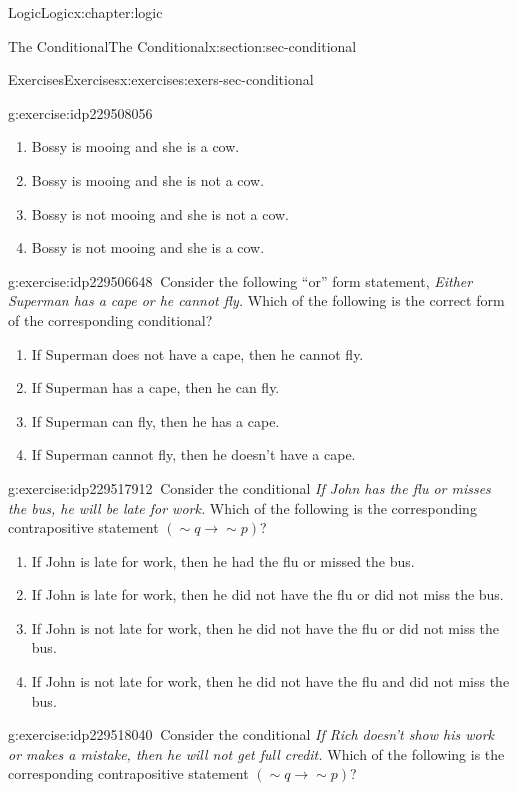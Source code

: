 \documentclass[twoside,10pt,]{book}
\numberwithin{equation}{section}
\newcommand{\contrapositive}{{\sim\!{q}{} {\rightarrow} \sim\!{p}{}}}
\begin{document}
\begin{chapterptx}{Logic}{}{Logic}{}{}{x:chapter:logic}
\begin{sectionptx}{The Conditional}{}{The Conditional}{}{}{x:section:sec-conditional}
\begin{exercises-subsection}{Exercises}{}{Exercises}{}{}{x:exercises:exers-sec-conditional}
\begin{divisionexercise}{31}{}{}{g:exercise:idp229508056}
\begin{enumerate}[label=(\alph*)]
\item{}Bossy is mooing and she is a cow.%
\item{}Bossy is mooing and she is not a cow.%
\item{}Bossy is not mooing and she is not a cow.%
\item{}Bossy is not mooing and she is a cow.%
\end{enumerate}
\end{divisionexercise}%
\begin{divisionexercise}{32}{}{}{g:exercise:idp229506648}%
\(\ \)Consider the following ``or'' form statement, \emph{Either Superman has a cape or he cannot fly.}  Which of the following is the correct form of the corresponding conditional? %
\begin{enumerate}[label=(\alph*)]
\item{}If Superman does not have a cape, then he cannot fly.%
\item{}If Superman has a cape, then he can fly.%
\item{}If Superman can fly, then he has a cape.%
\item{}If Superman cannot fly, then he doesn't have a cape.%
\end{enumerate}
\end{divisionexercise}%
\begin{divisionexercise}{33}{}{}{g:exercise:idp229517912}%
\(\ \)Consider the conditional \emph{If John has the flu or misses the bus, he will be late for work.}  Which of the following is the corresponding contrapositive statement \((\contrapositive)\)? %
\begin{enumerate}[label=(\alph*)]
\item{}If John is late for work, then he had the flu or missed the bus.%
\item{}If John is late for work, then he did not have the flu or did not miss the bus.%
\item{}If John is not late for work, then he did not have the flu or did not miss the bus.%
\item{}If John is not late for work, then he did not have the flu and did not miss the bus.%
\end{enumerate}
\end{divisionexercise}%
\begin{divisionexercise}{34}{}{}{g:exercise:idp229518040}%
\(\ \)Consider the conditional \emph{If Rich doesn't show his work or makes a mistake, then he will not get full credit.}  Which of the following is the corresponding contrapositive statement \((\contrapositive)\)? %

\end{divisionexercise}
\end{exercises-subsection}
\end{sectionptx}
\end{chapterptx}
\end{document}
